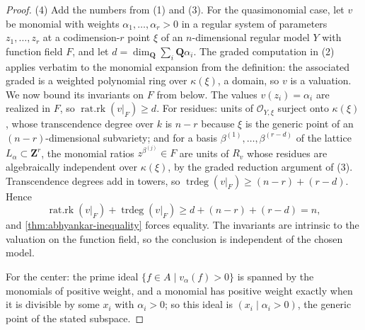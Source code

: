 \begin{proof}
(4) Add the numbers from (1) and (3). For the quasimonomial case, let
$v$ be monomial with weights $\alpha_1,\ldots,\alpha_r>0$ in a regular
system of parameters $z_1,\ldots,z_r$ at a codimension-$r$ point $\xi$ of an
$n$-dimensional regular model $Y$ with function field $F$, and let
$d=\dim_{\mathbf Q}\sum_i\mathbf Q\alpha_i$. The graded computation in
(2) applies verbatim to the monomial expansion from the definition: the
associated graded is a weighted polynomial ring over
$\kappa(\xi)$, a domain, so $v$ is a valuation. We now bound its
invariants on $F$ from below. The values $v(z_i)=\alpha_i$ are realized
in $F$, so $\operatorname{rat.rk}(v|_F)\geq d$. For residues: units of
$\mathcal O_{Y,\xi}$ surject onto $\kappa(\xi)$, whose transcendence
degree over $k$ is $n-r$ because $\xi$ is the generic point of an
$(n-r)$-dimensional subvariety; and for a basis
$\beta^{(1)},\ldots,\beta^{(r-d)}$ of the lattice
$L_\alpha\subset\mathbf Z^r$, the monomial ratios
$z^{\beta^{(j)}}\in F$ are units of $R_v$ whose residues are
algebraically independent over $\kappa(\xi)$, by the graded reduction
argument of (3). Transcendence degrees add in towers, so
$\operatorname{trdeg}(v|_F)\geq(n-r)+(r-d)$. Hence
\[
 \operatorname{rat.rk}(v|_F)+\operatorname{trdeg}(v|_F)
 \geq d+(n-r)+(r-d)=n ,
\]
and \cref{thm:abhyankar-inequality} forces equality. The invariants are
intrinsic to the valuation on the function field, so the conclusion is
independent of the chosen model.

For the center: the prime ideal
$\{f\in A\mid v_\alpha(f)>0\}$ is spanned by the monomials of positive
weight, and a monomial has positive weight exactly when it is divisible
by some $x_i$ with $\alpha_i>0$; so this ideal is
$(x_i\mid\alpha_i>0)$, the generic point of the stated subspace.
\end{proof}

